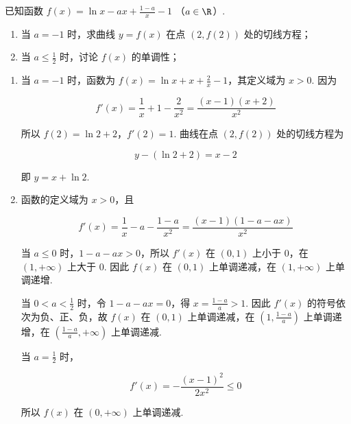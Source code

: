 \begin{problem}
已知函数 \(f(x) = \ln x - ax + \frac{1 - a}{x} - 1\) （\(a \in \R\)）.

\begin{enumerate}
\item 当 \(a = -1\) 时，求曲线 \(y = f(x)\) 在点 \((2, f(2))\) 处的切线方程；
\item 当 \(a \leqslant \frac{1}{2}\) 时，讨论 \(f(x)\) 的单调性；
\end{enumerate}
\end{problem}

\begin{solution}
\begin{enumerate}
\item 当 \(a=-1\) 时，函数为 \(f(x)=\ln x+x+\frac{2}{x}-1\)，其定义域为 \(x>0\). 因为

\[
f'(x)=\frac{1}{x}+1-\frac{2}{x^2}=\frac{(x-1)(x+2)}{x^2}
\]

所以 \(f(2)=\ln2+2\)，\(f'(2)=1\). 曲线在点 \((2,f(2))\) 处的切线方程为

\[
y-(\ln2+2)=x-2
\]

即 \(y=x+\ln2\).

\item 函数的定义域为 \(x>0\)，且

\[
f'(x)=\frac{1}{x}-a-\frac{1-a}{x^2}=\frac{(x-1)(1-a-ax)}{x^2}
\]

当 \(a\leqslant0\) 时，\(1-a-ax>0\)，所以 \(f'(x)\) 在 \((0,1)\) 上小于 \(0\)，在 \((1,+\infty)\) 上大于 \(0\). 因此 \(f(x)\) 在 \((0,1)\) 上单调递减，在 \((1,+\infty)\) 上单调递增.

当 \(0<a<\frac{1}{2}\) 时，令 \(1-a-ax=0\)，得 \(x=\frac{1-a}{a}>1\). 因此 \(f'(x)\) 的符号依次为负、正、负，故 \(f(x)\) 在 \(\left(0,1\right)\) 上单调递减，在 \(\left(1,\frac{1-a}{a}\right)\) 上单调递增，在 \(\left(\frac{1-a}{a},+\infty\right)\) 上单调递减.

当 \(a=\frac{1}{2}\) 时，

\[
f'(x)=-\frac{(x-1)^2}{2x^2}\leqslant0
\]

所以 \(f(x)\) 在 \((0,+\infty)\) 上单调递减.
\end{enumerate}
\end{solution}


